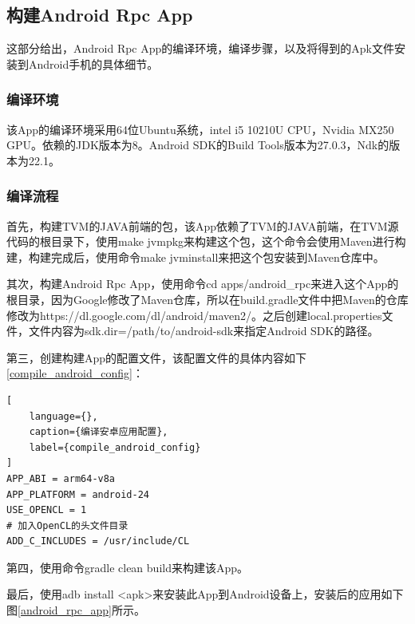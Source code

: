 \subsection{构建Android Rpc App}

这部分给出，Android Rpc App的编译环境，编译步骤，以及将得到的Apk文件安装到Android手机的具体细节。


\subsubsection{编译环境}

该App的编译环境采用64位Ubuntu系统，intel i5 10210U CPU，Nvidia MX250 GPU。依赖的JDK版本为8。Android SDK的Build Tools版本为27.0.3，Ndk的版本为22.1。

\subsubsection{编译流程}

首先，构建TVM的JAVA前端的包，该App依赖了TVM的JAVA前端，在TVM源代码的根目录下，使用make jvmpkg来构建这个包，这个命令会使用Maven进行构建，构建完成后，使用命令make jvminstall来把这个包安装到Maven仓库中。

其次，构建Android Rpc App，使用命令cd apps/android\_rpc来进入这个App的根目录，因为Google修改了Maven仓库，所以在build.gradle文件中把Maven的仓库修改为https://dl.google.com/dl/android/maven2/。之后创建local.properties文件，文件内容为sdk.dir=/path/to/android-sdk来指定Android SDK的路径。

第三，创建构建App的配置文件，该配置文件的具体内容如下\ref{compile_android_config}：

\begin{lstlisting}[
    language={},
    caption={编译安卓应用配置},
    label={compile_android_config}
]
APP_ABI = arm64-v8a
APP_PLATFORM = android-24
USE_OPENCL = 1
# 加入OpenCL的头文件目录
ADD_C_INCLUDES = /usr/include/CL
\end{lstlisting}

第四，使用命令gradle clean build来构建该App。

最后，使用adb install <apk>来安装此App到Android设备上，安装后的应用如下图\ref{android_rpc_app}所示。

